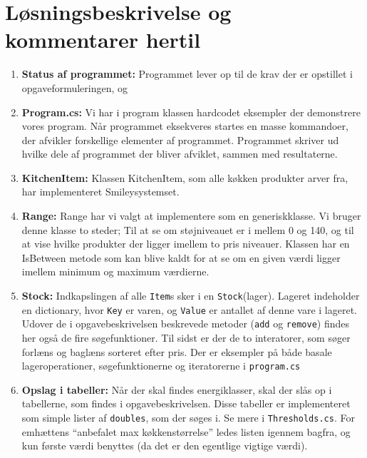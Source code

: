 \documentclass[11pt]{article}
\newcommand{\mono}{\texttt}
\begin{document}
\section{Løsningsbeskrivelse og kommentarer hertil}
\begin{enumerate}
	\item[] \textbf{Status af programmet:}
	Programmet lever op til de krav der er opstillet i opgaveformuleringen, og 
	\item[] \textbf{Program.cs:}
	Vi har i program klassen hardcodet eksempler der demonstrere vores program. Når programmet eksekveres startes en masse kommandoer, der afvikler forskellige elementer af programmet. Programmet skriver ud hvilke dele af programmet der bliver afviklet, sammen med resultaterne. 
		
	
	\item[] \textbf{KitchenItem:} Klassen KitchenItem, som alle køkken produkter arver fra, har implementeret Smileysystemset.
	
	
	\item[] \textbf{Range:}
	 Range har vi valgt at implementere som en generiskklasse. Vi bruger denne klasse to steder; Til at se om støjniveauet er i mellem 0 og 140, og til at vise hvilke produkter der ligger imellem to pris niveauer. Klassen har en IsBetween metode som kan blive kaldt for at se om en given værdi ligger imellem minimum og maximum værdierne.
	 
	 
	 

	
	\item[] \textbf{Stock:} Indkapslingen af alle \mono{Item}s sker i en \mono{Stock}(lager). Lageret indeholder en dictionary, hvor \mono{Key} er varen, og \mono{Value} er antallet af denne vare i lageret. Udover de i opgavebeskrivelsen beskrevede metoder (\mono{add} og \mono{remove}) findes her også de fire søgefunktioner. Til sidst er der de to interatorer, som søger forlæns og baglæns sorteret efter pris. Der er eksempler på både basale lageroperationer, søgefunktionerne og iteratorerne i \mono{program.cs}
	
	\item[] \textbf{Opslag i tabeller:} Når der skal findes energiklasser, skal der slås op i tabellerne, som findes i opgavebeskrivelsen. Disse tabeller er implementeret som simple lister af \mono{doubles}, som der søges i. Se mere i \mono{Thresholds.cs}. For emhættens ``anbefalet max køkkenstørrelse'' ledes listen igennem bagfra, og kun første værdi benyttes (da det er den egentlige vigtige værdi).
\end{enumerate}
\end{document}
